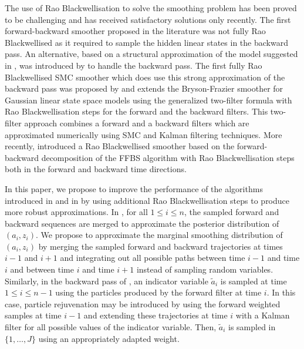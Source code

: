 The use of Rao Blackwellisation to solve the smoothing problem has been proved to be challenging and has received satisfactory solutions only recently. The first forward-backward smoother proposed in the literature \cite{fong:godsill:doucet:west:2002} was not fully Rao Blackwellised as it required to sample the hidden linear states in the backward pass. An alternative, based on a structural approximation of the model suggested in \cite{kim:1994}, was introduced by \cite{barber:2006} to handle the backward pass.  The first fully Rao Blackwellised SMC smoother which does use this strong approximation of the backward pass was proposed by  \cite{briers:doucet:maskell:2010} and extends the Bryson-Frazier smoother for Gaussian linear state space models using the generalized two-filter formula with Rao Blackwellisation steps for the forward and the backward filters.  This two-filter approach combines a forward and a backward filters which are approximated numerically using SMC and Kalman filtering techniques. More recently, \cite{lindsten:bunch:sarkka:schon:godsill:2015,sarkka:bunch:godsill:2012,lindsten:bunch:godsill:schon:2013} introduced a Rao Blackwellised smoother based on the forward-backward decomposition of the FFBS algorithm with Rao Blackwellisation steps both in the forward and backward time directions. 

In this paper, we propose to improve the performance of the algorithms introduced in \cite{briers:doucet:maskell:2010} and in \cite{lindsten:bunch:sarkka:schon:godsill:2015,sarkka:bunch:godsill:2012,lindsten:bunch:godsill:schon:2013} by using additional Rao Blackwellisation steps to produce more robust approximations.  In \cite{briers:doucet:maskell:2010}, for all $1\le i\le n$, the sampled forward and backward sequences are merged to approximate the posterior distribution of $(a_i,z_i)$. We propose to approximate the marginal smoothing distribution of $(a_i,z_i)$ by merging the sampled forward and backward trajectories at times $i-1$ and $i+1$ and integrating out all possible paths between time $i-1$ and time $i$ and between time $i$ and time $i+1$ instead of sampling random variables. Similarly, in the backward pass of \cite{lindsten:bunch:sarkka:schon:godsill:2015,sarkka:bunch:godsill:2012,lindsten:bunch:godsill:schon:2013}, an indicator variable $\tilde{a}_i$ is sampled at time $1\le i\le n-1$ using the particles produced by the forward filter at time $i$. In this case, particle rejuvenation may be introduced by using the forward weighted samples at time $i-1$ and extending these trajectories at time $i$ with a Kalman filter for all possible values of the indicator variable. Then, $\tilde{a}_i$ is sampled in $\{1,\ldots,J\}$ using an appropriately adapted weight.

